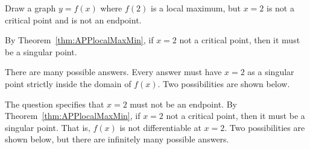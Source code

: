 \begin{question}
Draw a graph $y=f(x)$ where $f(2)$ is a local maximum, but $x=2$ is not a critical point and is not an endpoint.
\end{question}
\begin{hint}
By Theorem~\ref*{thm:APPlocalMaxMin},
if $x=2$ not a critical point, then it must be a singular point. 
\end{hint}
\begin{answer}
There are many possible answers. Every answer must have $x=2$ as a singular point strictly inside the domain of $f(x)$. Two possibilities are shown below.
\begin{center}
\hspace{2cm}
\end{center}
\end{answer}
\begin{solution}
The question specifies that $x=2$ must not be an endpoint.
By Theorem~\ref*{thm:APPlocalMaxMin}, if $x=2$ not a critical point, then it must be a singular point. That is, $f(x)$ is not differentiable at $x=2$. Two possibilities are shown below, but there are infinitely many possible answers.
\begin{center}
\hspace{2cm}
\end{center}
\end{solution}





